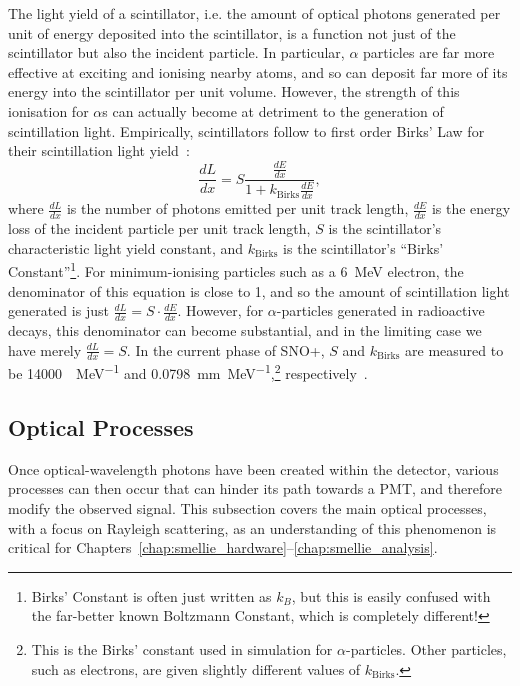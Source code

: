 The light yield of a scintillator, i.e. the amount of optical photons generated per unit of energy deposited into the scintillator, is a function not just of the scintillator but also the incident particle. In particular, $\alpha$ particles are far more effective at exciting and ionising nearby atoms, and so can deposit far more of its energy into the scintillator per unit volume. However, the strength of this ionisation for $\alpha$s can actually become at detriment to the generation of scintillation light. Empirically, scintillators follow to first order Birks' Law for their scintillation light yield~\cite{}: %
\begin{equation}
    \frac{dL}{dx} = S\frac{\frac{dE}{dx}}{1+k_{\mathrm{Birks}}\frac{dE}{dx}},
\end{equation}
where $\frac{dL}{dx}$ is the number of photons emitted per unit track length, $\frac{dE}{dx}$ is the energy loss of the incident particle per unit track length, $S$ is the scintillator's characteristic light yield constant, and $k_{\mathrm{Birks}}$ is the scintillator's ``Birks' Constant''\footnote{Birks' Constant is often just written as $k_{B}$, but this is easily confused with the far-better known Boltzmann Constant, which is completely different!}. 
For minimum-ionising particles such as a \SI{6}{\MeV} electron, the denominator of this equation is close to 1, and so the amount of scintillation light generated is just $\frac{dL}{dx} = S\cdot\frac{dE}{dx}$. However, for $\alpha$-particles generated in radioactive decays, this denominator can become substantial, and in the limiting case we have merely $\frac{dL}{dx} = S$. In the current phase of SNO+, $S$ and $k_{\mathrm{Birks}}$ are measured to be \SI{14000}{\gamma\per\MeV} and \SI{0.0798}{\mm\per\MeV},\footnote{This is the Birks' constant used in simulation for $\alpha$-particles. Other particles, such as electrons, are given slightly different values of $k_{\mathrm{Birks}}$.}
 respectively~\cite{}. %

 \subsection{Optical Processes}
 Once optical-wavelength photons have been created within the detector, various processes can then occur that can hinder its path towards a PMT, and therefore modify the observed signal. This subsection covers the main optical processes, with a focus on Rayleigh scattering, as an understanding of this phenomenon is critical for Chapters~\ref{chap:smellie_hardware}--\ref{chap:smellie_analysis}.
